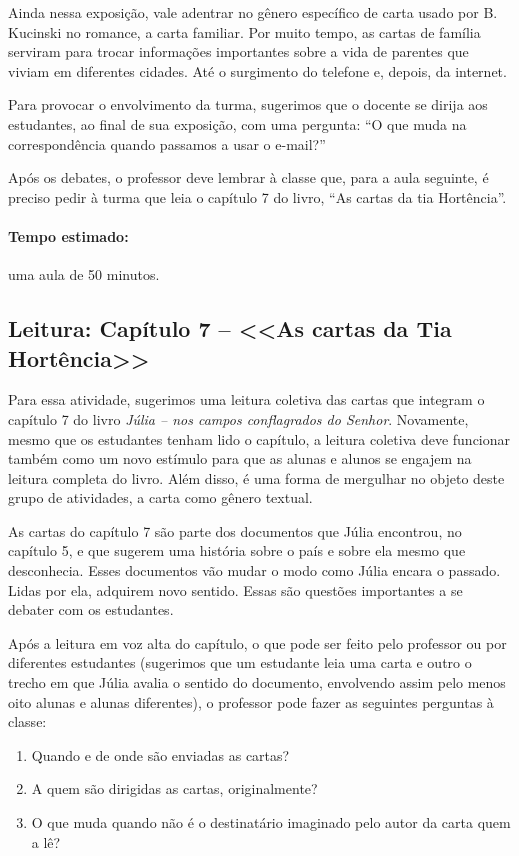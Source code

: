 \documentclass[12pt]{extarticle}
\begin{document}
Ainda nessa exposição, vale adentrar no gênero específico de carta usado
por B. Kucinski no romance, a carta familiar. Por muito tempo, as cartas
de família serviram para trocar informações importantes sobre a vida de
parentes que viviam em diferentes cidades. Até o surgimento do telefone
e, depois, da internet.

Para provocar o envolvimento da turma, sugerimos que o docente se dirija
aos estudantes, ao final de sua exposição, com uma pergunta: ``O que muda na
correspondência quando passamos a usar o e-mail?''

Após os debates, o professor deve lembrar à classe que, para a aula
seguinte, é preciso pedir à turma que leia o capítulo 7 do livro, ``As
cartas da tia Hortência''.

\paragraph{Tempo estimado:} uma aula de 50 minutos.

\subsection{Leitura: Capítulo 7 -- <<As cartas da Tia Hortência>>}

Para essa atividade, sugerimos uma leitura coletiva das cartas que
integram o capítulo 7 do livro \emph{Júlia -- nos campos conflagrados do
Senhor}. Novamente, mesmo que os estudantes tenham lido o capítulo, a
leitura coletiva deve funcionar também como um novo estímulo para que as
alunas e alunos se engajem na leitura completa do livro. Além disso, é uma forma de mergulhar no objeto deste grupo de atividades, a carta como
gênero textual.

As cartas do capítulo 7 são parte dos documentos que Júlia encontrou, no
capítulo 5, e que sugerem uma história sobre o país e sobre ela mesmo
que desconhecia. Esses documentos vão mudar o modo como Júlia encara o
passado. Lidas por ela, adquirem novo sentido. Essas são questões
importantes a se debater com os estudantes.

Após a leitura em voz alta do capítulo, o que pode ser feito pelo
professor ou por diferentes estudantes (sugerimos que um estudante leia
uma carta e outro o trecho em que Júlia avalia o sentido do documento,
envolvendo assim pelo menos oito alunas e alunas diferentes), o
professor pode fazer as seguintes perguntas à classe:

\begin{enumerate}

\item Quando e de onde são enviadas as cartas?

\item A quem são dirigidas as cartas, originalmente?

\item O que muda quando não é o destinatário imaginado pelo autor da carta
  quem a lê?

\end{enumerate}
\end{document}
